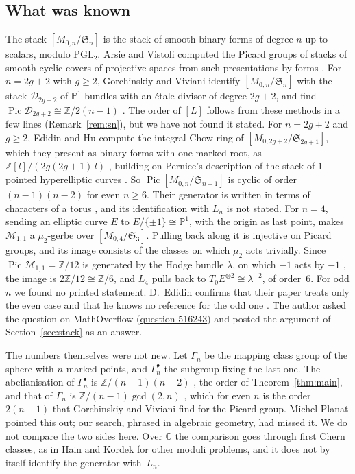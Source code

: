 \documentclass[11pt,a4paper]{amsart}
\theoremstyle{remark}
\newcommand{\M}{M_{0,n}}
\newcommand{\Sn}{\mathfrak S}
\newcommand{\Pic}{\operatorname{Pic}}
\newcommand{\PP}{\mathbb P^1}
\begin{document}
\subsection*{What was known}
The stack $[\M/\Sn_n]$ is the stack of smooth binary forms of degree $n$ up to scalars, modulo $\mathrm{PGL}_2$. Arsie and Vistoli computed the Picard groups of stacks of smooth cyclic covers of projective spaces from such presentations by forms \cite[Th.~5.1]{arsievistoli2004}. For $n = 2g+2$ with $g \ge 2$, Gorchinskiy and Viviani identify $[\M/\Sn_n]$ with the stack $\mathcal D_{2g+2}$ of $\PP$-bundles with an \'etale divisor of degree $2g+2$, and find $\Pic \mathcal D_{2g+2} \cong \mathbb Z/2(n-1)$ \cite[Prop.~3.4, Th.~3.6]{gorchinskiyviviani2008}. The order of $[L]$ follows from these methods in a few lines (Remark~\ref{rem:sn}), but we have not found it stated. For $n = 2g+2$ and $g \ge 2$, Edidin and Hu compute the integral Chow ring of $[M_{0,2g+2}/\Sn_{2g+1}]$, which they present as binary forms with one marked root, as $\mathbb Z[l]/(2g(2g+1)\,l)$ \cite[Th.~1.3]{edidinhu2025}, building on Pernice's description of the stack of $1$-pointed hyperelliptic curves \cite{pernice2022}. So $\Pic[\M/\Sn_{n-1}]$ is cyclic of order $(n-1)(n-2)$ for even $n \ge 6$. Their generator is written in terms of characters of a torus \cite[Th.~5.8]{edidinhu2025}, and its identification with $L_n$ is not stated. For $n = 4$, sending an elliptic curve $E$ to $E/\{\pm1\} \cong \PP$, with the origin as last point, makes $\mathcal M_{1,1}$ a $\mu_2$-gerbe over $[M_{0,4}/\Sn_3]$. Pulling back along it is injective on Picard groups, and its image consists of the classes on which $\mu_2$ acts trivially. Since $\Pic \mathcal M_{1,1} = \mathbb Z/12$ is generated by the Hodge bundle $\lambda$, on which $-1$ acts by $-1$ \cite{mumford1965,fultonolsson2010}, the image is $2\mathbb Z/12 \cong \mathbb Z/6$, and $L_4$ pulls back to $T_0E^{\otimes 2} \cong \lambda^{-2}$, of order~$6$. For odd $n$ we found no printed statement. D.~Edidin confirms that their paper treats only the even case and that he knows no reference for the odd one \cite{edidin2026}. The author asked the question on MathOverflow (\href{https://mathoverflow.net/q/516243}{question 516243}) and posted the argument of Section~\ref{sec:stack} as an answer.

The numbers themselves were not new. Let $\Gamma_n$ be the mapping class group of the sphere with $n$ marked points, and $\Gamma_n^\bullet$ the subgroup fixing the last one. The abelianisation of $\Gamma_n^\bullet$ is $\mathbb Z/(n-1)(n-2)$ \cite[Lem.~2.2]{bigelowbudney2001}, the order of Theorem~\ref{thm:main}, and that of $\Gamma_n$ is $\mathbb Z/(n-1)\gcd(2,n)$ \cite[\S5.1.3]{farbmargalit2012}, which for even $n$ is the order $2(n-1)$ that Gorchinskiy and Viviani find for the Picard group. Michel Planat pointed this out; our search, phrased in algebraic geometry, had missed it. We do not compare the two sides here. Over $\mathbb C$ the comparison goes through first Chern classes, as in Hain \cite[\S5]{hain1995} and Kordek \cite{kordek2016} for other moduli problems, and it does not by itself identify the generator with~$L_n$.
\end{document}
